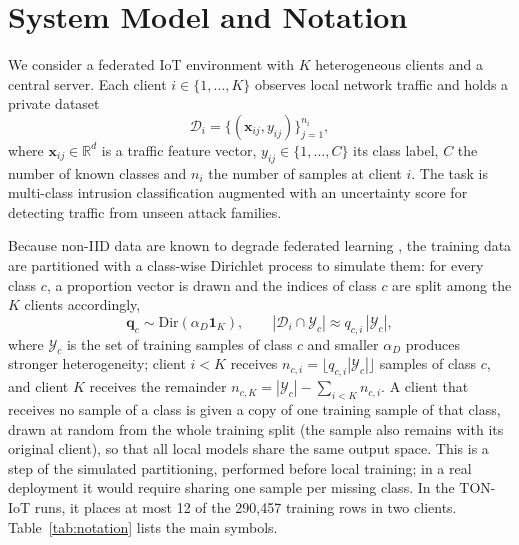 \documentclass[pdflatex,sn-mathphys-num]{sn-jnl}
\begin{document}
{%


\section{System Model and Notation}
\label{sec:system_model}
{\color{black}
We consider a federated IoT environment with $K$ heterogeneous clients and a central server. Each client $i\in\{1,\dots,K\}$ observes local network traffic and holds a private dataset
\begin{equation}
\mathcal{D}_i=\{(\mathbf{x}_{ij},y_{ij})\}_{j=1}^{n_i},\label{eq:data}
\end{equation}
where $\mathbf{x}_{ij}\in\mathbb{R}^d$ is a traffic feature vector, $y_{ij}\in\{1,\dots,C\}$ its class label, $C$ the number of known classes and $n_i$ the number of samples at client $i$. The task is multi-class intrusion classification augmented with an uncertainty score for detecting traffic from unseen attack families.

{\color{black}Because non-IID data are known to degrade federated learning \cite{zhao2018federated}, the training data are partitioned with a class-wise Dirichlet process to simulate them:} for every class $c$, a proportion vector is drawn and the indices of class $c$ are split among the $K$ clients accordingly,
\begin{equation}
\mathbf{q}_c\sim\mathrm{Dir}(\alpha_D\mathbf{1}_K),\qquad |\mathcal{D}_i\cap\mathcal{Y}_c|\approx q_{c,i}\,|\mathcal{Y}_c|,\label{eq:dirichlet}
\end{equation}
where $\mathcal{Y}_c$ is the set of training samples of class $c$ and smaller $\alpha_D$ produces stronger heterogeneity; client $i<K$ receives $n_{c,i}=\lfloor q_{c,i}|\mathcal{Y}_c|\rfloor$ samples of class $c$, and client $K$ receives the remainder $n_{c,K}=|\mathcal{Y}_c|-\sum_{i<K}n_{c,i}$. A client that receives no sample of a class is given a copy of one training sample of that class, drawn at random from the whole training split (the sample also remains with its original client), so that all local models share the same output space. This is a step of the simulated partitioning, performed before local training; in a real deployment it would require sharing one sample per missing class. In the TON-IoT runs, it places at most 12 of the 290{,}457 training rows in two clients. Table~\ref{tab:notation} lists the main symbols.}

}
\end{document}
